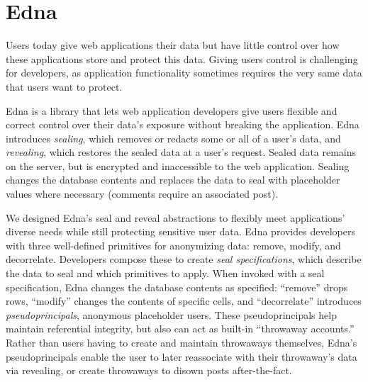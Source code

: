 \begin{comment}
- Papers included in thesis
- Content of papers (objectives/methods/Preliminary results)
\end{comment}

\section{Edna}

Users today give web applications their data but have little control over how
these applications store and protect this data.  Giving users control is
challenging for developers, as application functionality sometimes requires the
very same data that users want to protect.

Edna is a library that lets web application developers give users flexible and
correct control over their data’s exposure without breaking the application.
%
Edna introduces \emph{sealing}, which removes or redacts some or all of a user's
data, and \emph{revealing}, which restores the sealed data at a user's request.
Sealed data remains on the server, but is encrypted and inaccessible to the web
application. Sealing changes the database contents and replaces the data to seal
with placeholder values where necessary (\eg comments require an associated
post). 

We designed Edna's seal and reveal abstractions to flexibly meet applications'
diverse needs while still protecting sensitive user data. Edna provides
developers with three well-defined primitives for anonymizing data: remove,
modify, and decorrelate. Developers compose these to create \emph{seal
specifications}, which describe the data to seal and which primitives to apply.
When invoked with a seal specification, Edna changes the database contents as
specified: ``remove'' drops rows, ``modify'' changes the contents of specific
cells, and ``decorrelate'' introduces \emph{pseudoprincipals}, anonymous
placeholder users. These pseudoprincipals help maintain referential integrity,
but also can act as built-in ``throwaway accounts.'' Rather than users having to
create and maintain throwaways themselves, Edna's pseudoprincipals enable the
user to later reassociate with their throwaway's data via revealing, or create
throwaways to disown posts after-the-fact.

